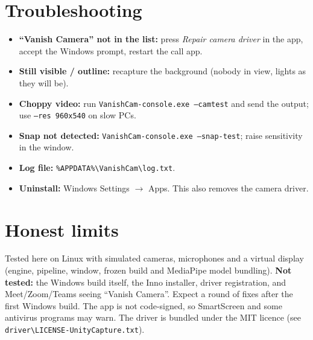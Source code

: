 \documentclass[11pt]{article}
\begin{document}
\section*{Troubleshooting}
\begin{itemize}
\item \textbf{``Vanish Camera'' not in the list:} press \emph{Repair camera driver} in the app, accept the Windows prompt, restart the call app.
\item \textbf{Still visible / outline:} recapture the background (nobody in view, lights as they will be).
\item \textbf{Choppy video:} run \texttt{VanishCam-console.exe --camtest} and send the output; use \texttt{--res 960x540} on slow PCs.
\item \textbf{Snap not detected:} \texttt{VanishCam-console.exe --snap-test}; raise sensitivity in the window.
\item \textbf{Log file:} \texttt{\%APPDATA\%\textbackslash VanishCam\textbackslash log.txt}.
\item \textbf{Uninstall:} Windows Settings $\rightarrow$ Apps. This also removes the camera driver.
\end{itemize}

\section*{Honest limits}
Tested here on Linux with simulated cameras, microphones and a virtual display (engine, pipeline, window, frozen build and MediaPipe model bundling). \textbf{Not tested:} the Windows build itself, the Inno installer, driver registration, and Meet/Zoom/Teams seeing ``Vanish Camera''. Expect a round of fixes after the first Windows build. The app is not code-signed, so SmartScreen and some antivirus programs may warn. The driver is bundled under the MIT licence (see \texttt{driver\textbackslash LICENSE-UnityCapture.txt}).
\end{document}
